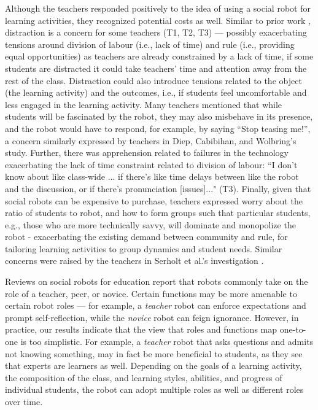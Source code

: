 Although the teachers responded positively to the idea of using a social robot for learning activities, they recognized potential costs as well. Similar to prior work \cite{Westlund2016}, distraction is a concern for some teachers (T1, T2, T3) --- possibly exacerbating tensions around division of labour (i.e., lack of time) and rule (i.e., providing equal opportunities) as teachers are already constrained by a lack of time, if some students are distracted it could take teachers' time and attention away from the rest of the class. Distraction could also introduce tensions related to the object (the learning activity) and the outcomes, i.e., if students feel uncomfortable and less engaged in the learning activity.  Many teachers mentioned that while students will be fascinated by the robot, they may also misbehave in its presence, and the robot would have to respond, for example, by saying ``Stop teasing me!'', a concern similarly expressed by teachers in Diep, Cabibihan, and Wolbring's \cite{diep2015} study. Further, there was apprehension related to failures in the technology exacerbating the lack of time constraint related to division of labour: ``I don’t know about like class-wide ... if there's like time delays between like the robot and the discussion, or if there's pronunciation [issues]..." (T3). Finally, given that social robots can be expensive to purchase, teachers expressed worry about the ratio of students to robot, and how to form groups such that particular students, e.g., those who are more technically savvy, will dominate and monopolize the robot - exacerbating the existing demand between community and rule, for tailoring learning activities to group dynamics and student needs.  Similar concerns were raised by the teachers in Serholt et al.'s investigation \cite{serholt2014teachers}.

Reviews on social robots for education \cite{belpaeme2018social,mubin13} report that robots commonly take on the role of a teacher, peer, or novice. Certain functions may be more amenable to certain robot roles --- for example, a {\it teacher} robot can enforce expectations and prompt self-reflection, while the {\it novice} robot can feign ignorance.  However, in practice, our results indicate that the view that roles and functions map one-to-one is too simplistic.  For example, a {\it teacher} robot that asks questions and admits not knowing something, may in fact be more beneficial to students, as they see that experts are learners as well.  Depending on the goals of a learning activity, the composition of the class, and learning styles, abilities, and progress of individual students, the robot can adopt multiple roles as well as different roles over time.

